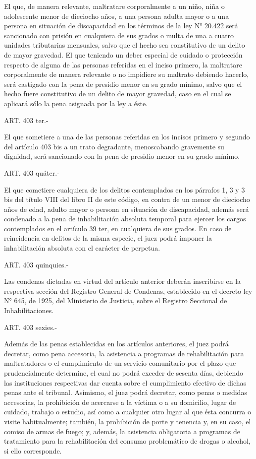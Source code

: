     El que, de manera relevante, maltratare corporalmente a un niño, niña o adolescente menor de dieciocho años, a una persona adulta mayor o a una persona en situación de discapacidad en los términos de la ley N° 20.422 será sancionado con prisión en cualquiera de sus grados o multa de una a cuatro unidades tributarias mensuales, salvo que el hecho sea constitutivo de un delito de mayor gravedad.
    El que teniendo un deber especial de cuidado o protección respecto de alguna de las personas referidas en el inciso primero, la maltratare corporalmente de manera relevante o no impidiere su maltrato debiendo hacerlo, será castigado con la pena de presidio menor en su grado mínimo, salvo que el hecho fuere constitutivo de un delito de mayor gravedad, caso en el cual se aplicará sólo la pena asignada por la ley a éste.

    ART. 403 ter.-

    El que sometiere a una de las personas referidas en los incisos primero y segundo del artículo 403 bis a un trato degradante, menoscabando gravemente su dignidad, será sancionado con la pena de presidio menor en su grado mínimo.

    ART. 403 quáter.-

    El que cometiere cualquiera de los delitos contemplados en los párrafos 1, 3 y 3 bis del título VIII del libro II de este código, en contra de un menor de dieciocho años de edad, adulto mayor o persona en situación de discapacidad, además será condenado a la pena de inhabilitación absoluta temporal para ejercer los cargos contemplados en el artículo 39 ter, en cualquiera de sus grados. En caso de reincidencia en delitos de la misma especie, el juez podrá imponer la inhabilitación absoluta con el carácter de perpetua.

    ART. 403 quinquies.-

    Las condenas dictadas en virtud del artículo anterior deberán inscribirse en la respectiva sección del Registro General de Condenas, establecido en el decreto ley N° 645, de 1925, del Ministerio de Justicia, sobre el Registro Seccional de Inhabilitaciones.



    ART. 403 sexies.-

    Además de las penas establecidas en los artículos anteriores, el juez podrá decretar, como pena accesoria, la asistencia a programas de rehabilitación para maltratadores o el cumplimiento de un servicio comunitario por el plazo que prudencialmente determine, el cual no podrá exceder de sesenta días, debiendo las instituciones respectivas dar cuenta sobre el cumplimiento efectivo de dichas penas ante el tribunal.
    Asimismo, el juez podrá decretar, como penas o medidas accesorias, la prohibición de acercarse a la víctima o a su domicilio, lugar de cuidado, trabajo o estudio, así como a cualquier otro lugar al que ésta concurra o visite habitualmente; también, la prohibición de porte y tenencia y, en su caso, el comiso de armas de fuego; y, además, la asistencia obligatoria a programas de tratamiento para la rehabilitación del consumo problemático de drogas o alcohol, si ello corresponde.

